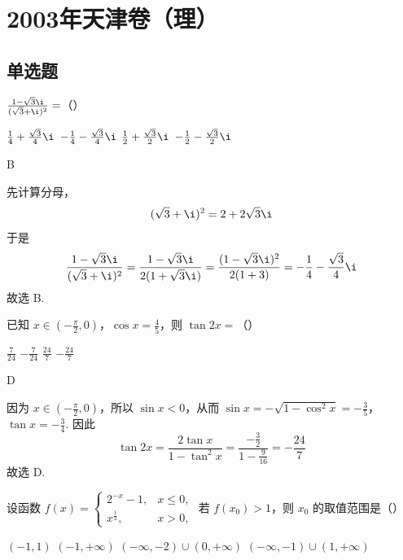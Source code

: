 \chapter{2003年天津卷（理）}
\section{单选题}
\begin{problem}
\(\frac{1 - \sqrt{3}\i}{(\sqrt{3} + \i)^2} =\)（\quad）

\choices
    {\(\frac{1}{4} + \frac{\sqrt{3}}{4}\i\)}
    {\(-\frac{1}{4} - \frac{\sqrt{3}}{4}\i\)}
    {\(\frac{1}{2} + \frac{\sqrt{3}}{2}\i\)}
    {\(-\frac{1}{2} - \frac{\sqrt{3}}{2}\i\)}
\end{problem}

\begin{answer}
B
\end{answer}

\begin{solution}
先计算分母，
\[
(\sqrt{3}+\i)^2=2+2\sqrt{3}\i
\]
于是
\[
\frac{1-\sqrt{3}\i}{(\sqrt{3}+\i)^2}=\frac{1-\sqrt{3}\i}{2(1+\sqrt{3}\i)}=\frac{(1-\sqrt{3}\i)^2}{2(1+3)}=-\frac14-\frac{\sqrt{3}}4\i
\]
故选 B.
\end{solution}

\begin{problem}
已知 \(x \in \left(-\frac{\pi}{2}, 0\right)\)，\(\cos x = \frac{4}{5}\)，则 \(\tan 2x =\)（\quad）

\choices
    {\(\frac{7}{24}\)}
    {\(-\frac{7}{24}\)}
    {\(\frac{24}{7}\)}
    {\(-\frac{24}{7}\)}
\end{problem}

\begin{answer}
D
\end{answer}

\begin{solution}
因为 \(x\in\left(-\frac\pi2,0\right)\)，所以 \(\sin x<0\)，从而
\(\sin x=-\sqrt{1-\cos^2x}=-\frac35\)，\(\tan x=-\frac34\).
因此
\[
\tan2x=\frac{2\tan x}{1-\tan^2x}=\frac{-\frac32}{1-\frac9{16}}=-\frac{24}{7}
\]
故选 D.
\end{solution}

\begin{problem}
设函数 \( f(x) = \begin{cases}
2^{-x} - 1, & x \leqslant 0,\\
x^{\frac{1}{2}}, & x > 0,
\end{cases} \) 若 \( f(x_0) > 1 \)，则 \( x_0 \) 的取值范围是（\quad）

\choices
    {\( (-1,1) \)}
    {\((-1, +\infty)\)}
    {\((- \infty, -2) \cup (0, +\infty)\)}
    {\((- \infty, -1) \cup (1, +\infty)\)}
\end{problem}

